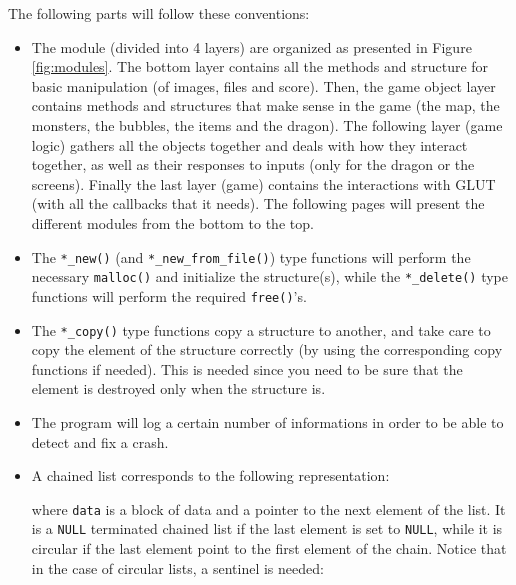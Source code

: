 \documentclass[12pt,a4paper]{article}
\newcommand{\cc}[1]{\texttt{#1}}
\begin{document}
The following parts will follow these conventions:

\begin{itemize}
\item The module (divided into 4 layers) are organized as presented in Figure \ref{fig:modules}. The bottom layer contains all the methods and structure for basic manipulation (of images, files and score). Then, the game object layer contains methods and structures that make sense in the game (the map, the monsters, the bubbles, the items and the dragon). The following layer (game logic) gathers all the objects together and deals with how they interact together, as well as their responses to inputs (only for the dragon or the screens). Finally the last layer (game) contains the interactions with GLUT (with all the callbacks that it needs). The following pages will present the different modules from the bottom to the top.
\item The \cc{*_new()}  (and \cc{*_new_from_file()}) type functions will perform the necessary \cc{malloc()} and initialize the structure(s), while the \cc{*_delete()} type functions will perform the required \cc{free()}'s. 
\item The \cc{*_copy()} type functions copy a structure to another, and take care to copy the element of the structure correctly (by using the corresponding copy functions if needed). This is needed since you need to be sure that the element is destroyed only when the structure is.
\item The program will log a certain number of informations in order to be able to detect and fix a crash.
\item A chained list corresponds to the following representation:\begin{center}
\end{center}
where \cc{data} is a block of data and  a pointer to the next element of the list. It is a \cc{NULL} terminated chained list if the last element is set to \cc{NULL}, while it is circular if the last element point to the first element of the chain. Notice that in the case of circular lists, a sentinel is needed: \begin{center}
\end{center}
\end{itemize}
\end{document}
